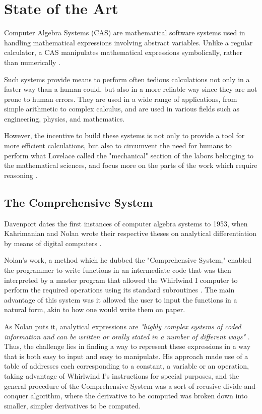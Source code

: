 \chapter{State of the Art}\label{chap:state-of-the-art}

Computer Algebra Systems (CAS) are mathematical software systems used in handling mathematical expressions involving abstract variables. Unlike a regular calculator, a CAS manipulates mathematical expressions symbolically, rather than numerically \parencite{bou2009computer}.

Such systems provide means to perform often tedious calculations not only in a faster way than a human could, but also in a more reliable way since they are not prone to human errors. They are used in a wide range of applications, from simple arithmetic to complex calculus, and are used in various fields such as engineering, physics, and mathematics.

However, the incentive to build these systems is not only to provide a tool for more efficient calculations, but also to circumvent the need for humans to perform what Lovelace called the "mechanical" section of the labors belonging to the mathematical sciences, and focus more on the parts of the work which require reasoning \parencite{lovelace1842sketch}.

\section{The Comprehensive System}\label{sec:the-comprehensive-system}

Davenport dates the first instances of computer algebra systems to 1953, when Kahrimanian and Nolan wrote their respective theses on analytical differentiation by means of digital computers \parencite{davenport1994computer}.

Nolan's work, a method which he dubbed the "Comprehensive System," enabled the programmer to write functions in an intermediate code that was then interpreted by a master program that allowed the Whirlwind I computer to perform the required operations using its standard subroutines \parencite{nolan1953analytical}. The main advantage of this system was it allowed the user to input the functions in a natural form, akin to how one would write them on paper.

As Nolan puts it, analytical expressions are \textit{"highly complex systems of coded information and can be written or orally stated in a number of different ways"} \parencite{nolan1953analytical}. Thus, the challenge lies in finding a way to represent these expressions in a way that is both easy to input and easy to manipulate. His approach made use of a table of addresses each corresponding to a constant, a variable or an operation, taking advantage of Whirlwind I's instructions for special purposes, and the general procedure of the Comprehensive System was a sort of recusive divide-and-conquer algorithm, where the derivative to be computed was broken down into smaller, simpler derivatives to be computed.

